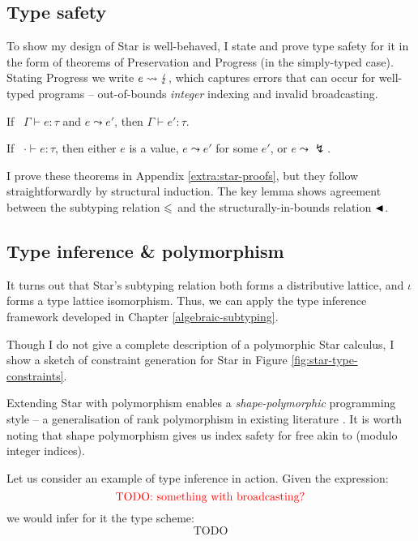 \subsection{Type safety}
\label{subsec:type-safety}

To show my design of Star is well-behaved, I state and prove type safety for it in the form of theorems of Preservation and Progress (in the simply-typed case). Stating Progress we write $e \leadsto \lightning$, which captures errors that can occur for well-typed programs -- out-of-bounds \emph{integer} indexing and invalid broadcasting.

\begin{theorem}[Preservation]
    If \ $\Gamma \vdash e : \tau$ and $e \leadsto e'$, then $\Gamma \vdash e' : \tau$.
\end{theorem}
\begin{theorem}[Progress]
    If \ $\cdot \vdash e : \tau$, then either $e$ is a value, $e \leadsto e'$ for some $e'$, or $e \leadsto \lightning$.
\end{theorem}

I prove these theorems in Appendix \ref{extra:star-proofs}, but they follow straightforwardly by structural induction. The key lemma shows agreement between the subtyping relation $\leqslant$ and the structurally-in-bounds relation $\blacktriangleleft$.


\subsection{Type inference \& polymorphism}
\label{subsec:type-inference}

It turns out that Star's subtyping relation both forms a distributive lattice, and $\iota$ forms a type lattice isomorphism.
Thus, we can apply the type inference framework developed in Chapter \ref{algebraic-subtyping}. 

Though I do not give a complete description of a polymorphic Star calculus, I show a sketch of constraint generation for Star in Figure \ref{fig:star-type-constraints}.

Extending Star with polymorphism enables a \emph{shape-polymorphic} programming style -- a generalisation of rank polymorphism in existing literature \cite{automap, sac-tensor-comprehensions}. 
It is worth noting that shape polymorphism gives us index safety for free akin to \textcite{theorems-for-free} (modulo integer indices).

Let us consider an example of type inference in action. Given the expression:
$$ \color{red} \text{TODO: something with broadcasting?} $$
we would infer for it the type scheme:
$$ \text{TODO} $$


